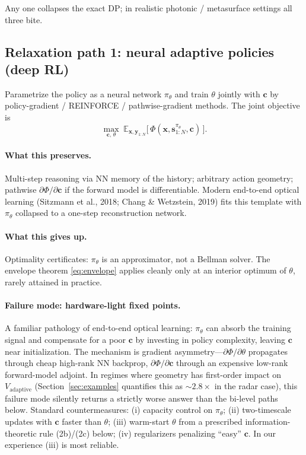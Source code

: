 \documentclass[11pt,a4paper]{article}
\newcommand{\E}{\mathbb{E}}
\begin{document}
Any one collapses the exact DP; in realistic photonic / metasurface settings all three bite.

\subsection{Relaxation path 1: neural adaptive policies (deep RL)}
\label{subsec:deep_rl}

Parametrize the policy as a neural network $\pi_\theta$ and train $\theta$ jointly with $\bm{c}$ by policy-gradient / REINFORCE / pathwise-gradient methods.  The joint objective is
\begin{equation}
  \max_{\bm{c},\,\theta}\; \E_{\bm{x}, \bm{y}_{1:N}}\bigl[\,\Phi(\bm{x},\bm{s}_{1:N}^{\pi_\theta},\bm{c})\,\bigr].
  \label{eq:deep_rl_joint}
\end{equation}

\paragraph{What this preserves.}  Multi-step reasoning via NN memory of the history; arbitrary action geometry; pathwise $\partial\Phi/\partial\bm{c}$ if the forward model is differentiable.  Modern end-to-end optical learning (Sitzmann et al., 2018; Chang \& Wetzstein, 2019) fits this template with $\pi_\theta$ collapsed to a one-step reconstruction network.

\paragraph{What this gives up.}  Optimality certificates: $\pi_\theta$ is an approximator, not a Bellman solver.  The envelope theorem \eqref{eq:envelope} applies cleanly only at an interior optimum of $\theta$, rarely attained in practice.

\paragraph{Failure mode: hardware-light fixed points.}  A familiar pathology of end-to-end optical learning: $\pi_\theta$ can absorb the training signal and compensate for a poor $\bm{c}$ by investing in policy complexity, leaving $\bm{c}$ near initialization.  The mechanism is gradient asymmetry---$\partial\Phi/\partial\theta$ propagates through cheap high-rank NN backprop, $\partial\Phi/\partial\bm{c}$ through an expensive low-rank forward-model adjoint.  In regimes where geometry has first-order impact on $V_{\mathrm{adaptive}}$ (Section~\ref{sec:examples} quantifies this as $\sim\!2.8\times$ in the radar case), this failure mode silently returns a strictly worse answer than the bi-level paths below.  Standard countermeasures: (i) capacity control on $\pi_\theta$; (ii) two-timescale updates with $\bm{c}$ faster than $\theta$; (iii) warm-start $\theta$ from a prescribed information-theoretic rule (2b)/(2c) below; (iv) regularizers penalizing ``easy'' $\bm{c}$.  In our experience (iii) is most reliable.
\end{document}

